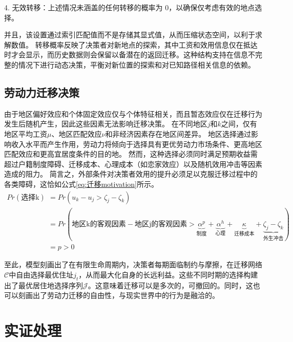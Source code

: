 \documentclass[
  a4paper,
  zihao=-4,
  fontset=mac,
  AutoFakeBold,
  AutoFakeSlant,
  oneside]{ctexbook}
\begin{document}
4. 无效转移：上述情况未涵盖的任何转移的概率为 0，以确保仅考虑有效的地点选择。

并且，该设置通过索引匹配值而不是存储其显式值，从而压缩状态空间，以利于求解数值。
转移概率反映了决策者对新地点的探索，其中工资和效用信息仅在抵达时才会显示，而历史数据则会保留以备潜在的返回迁移。这种结构支持在信息不完整的情况下进行动态决策，平衡对新位置的探索和对已知路径相关信息的依赖。

\section{劳动力迁移决策}

由于地区偏好效应和个体固定效应仅与个体特征相关，而且暂态效应仅在迁移行为发生后随机产生，因此这些因素无法影响迁移决策。
在不同地区$j$和$k$之间，仅有地区平均工资$\mu$、地区匹配效应$\nu$和非经济因素存在地区间差异。
地区选择通过影响收入水平而产生作用，劳动力将倾向于选择具有更优劳动力市场条件、更高地区匹配效应和更高宜居度条件的目的地。
然而，这种选择必须同时满足预期收益需超过户籍制度障碍、迁移成本、心理成本（如恋家效应）以及随机效用冲击等因素造成的阻力。
简言之，外部条件对决策者效用的提升必须足以克服迁移过程中的各类障碍，这恰如公式\ref{eq:迁移motivation}所示。
\begin{equation}
\begin{split}
  Pr(\text{选择k})&= Pr(u_k - u_j > \zeta_j - \zeta_k) 
  \\&= Pr(
  \text{地区k的客观因素} - \text{地区j的客观因素} 
  > 
  \underbrace{\alpha^p}_{\text{制度}} + \underbrace{\alpha^h}_{\text{心理}} + \underbrace{\kappa}_{\text{迁移成本}} + \underbrace{
  \zeta_j - \zeta_k}_{\text{外生冲击}} 
  )
  \\&= p >0
\end{split}
\label{eq:迁移motivation}
\end{equation}

至此，模型刻画出了在有限生命周期内，决策者每期面临制约与摩擦，在迁移网络$\mathcal{C}$中自由选择最优住址$j_t$，从而最大化自身的长远利益。这些不同时期的选择构建出了最优居住地选择序列$\mathcal{J}$。这意味着迁移可以是多次的，可撤回的。同时，这也可以刻画出了劳动力迁移的自由性，与现实世界中的行为是融洽的。




\chapter{实证处理}
\end{document}

